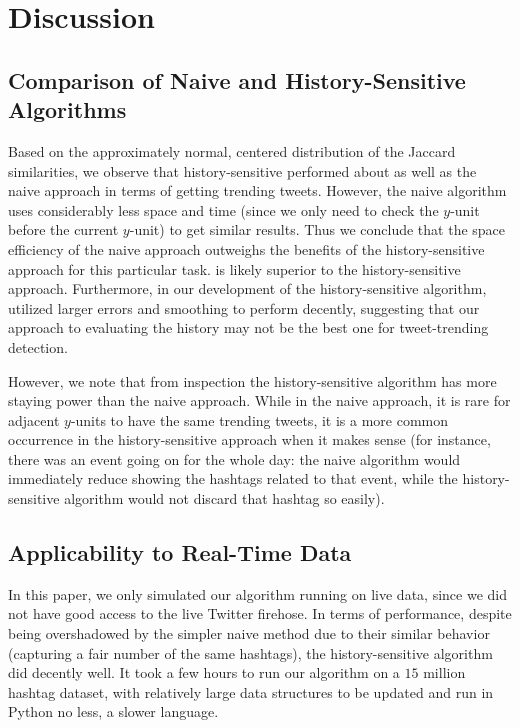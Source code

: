 \documentclass[twoside]{article}
\begin{document}
{%

\section{Discussion}

\subsection{Comparison of Naive and History-Sensitive Algorithms}

Based on the approximately normal, centered distribution of the Jaccard similarities, we observe that history-sensitive performed about as well as the naive approach in terms of getting trending tweets. However, the naive algorithm uses considerably less space and time (since we only need to check the 
$y$-unit before the current $y$-unit) to get similar results. Thus we conclude that the space efficiency of the naive approach outweighs the benefits of the history-sensitive approach for this particular task. 
is likely superior to the history-sensitive approach. Furthermore, in our development of the history-sensitive algorithm, utilized larger errors and smoothing to perform decently, suggesting that
our approach to evaluating the history may not be the best one for tweet-trending detection. 

However, we note that from inspection the history-sensitive algorithm has more staying power than 
the naive approach. While in the naive approach, it is rare for adjacent $y$-units to have the same
trending tweets, it is a more common occurrence in the history-sensitive approach when it makes sense (for instance, there was an event going on for the whole day: the naive algorithm would immediately reduce showing the hashtags related to that event, while the history-sensitive algorithm would not discard that
hashtag so easily).

\subsection{Applicability to Real-Time Data}

In this paper, we only simulated our algorithm running on live data, since we did not 
have good access to the live Twitter firehose. In terms of performance, despite being overshadowed
by the simpler naive method due to their similar behavior (capturing a fair number of the same hashtags), 
the history-sensitive algorithm did decently well. It took a few hours to run our algorithm 
on a $15$ million hashtag dataset, with relatively large data structures to be updated and run in Python no less, a slower language.

}
\end{document}
